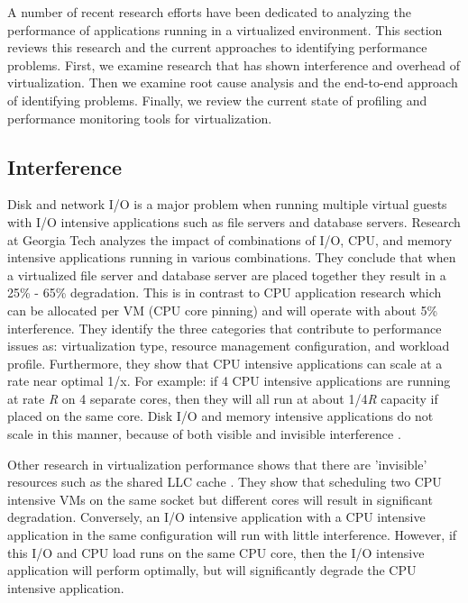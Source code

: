 A number of recent research efforts have been dedicated to analyzing the performance of applications running in a virtualized environment.  This section reviews this research and the current approaches to identifying performance problems.  First, we examine research that has shown interference and overhead of virtualization.   Then we examine root cause analysis and the end-to-end approach of identifying problems.  Finally, we review the current state of profiling and performance monitoring tools for virtualization.

\subsection{Interference}
Disk and network I/O is a major problem when running multiple virtual guests with I/O intensive applications such as file servers and database servers.  Research at Georgia Tech \cite{paul} analyzes the impact of combinations of I/O, CPU, and memory intensive applications running in various combinations.  They conclude that when a virtualized file server and database server are placed together they result in a 25\% - 65\% degradation.  This is in contrast to CPU application research \cite{huber1, huber2} which can be allocated per VM (CPU core pinning) and will operate with about 5\% interference.  They identify the three categories that contribute to performance issues as:  virtualization type, resource management configuration, and workload profile.  Furthermore, they show that CPU intensive applications can scale at a rate near optimal 1/x.   For example: if 4 CPU intensive applications are running at rate \emph{R} on 4 separate cores, then they will all run at about 1/4\emph{R} capacity if placed on the same core.   Disk I/O and memory intensive applications do not scale in this manner, because of both visible and invisible interference \cite{tickoo}.

Other research in virtualization performance shows that there are 'invisible' resources such as the shared LLC cache \cite{tickoo}.  They show that scheduling two CPU intensive VMs on the same socket but different cores will result in significant degradation.  Conversely, an I/O intensive application with a CPU intensive application in the same configuration will run with little interference.  However, if this I/O and CPU load runs on the same CPU core, then the I/O intensive application will perform optimally, but will significantly degrade the CPU intensive application.  

